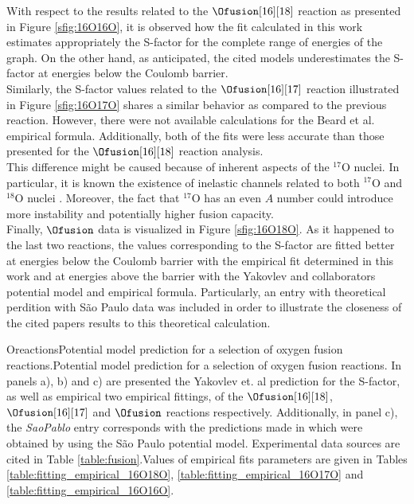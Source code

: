 \documentclass[openany]{book}
\begin{document}
With respect to the results related to the $\Ofusion[16][18]$ reaction as presented in Figure \ref{sfig:16O16O}, it is observed how the fit calculated in this work estimates appropriately the S-factor for the complete range of energies of the graph. On the other hand, as anticipated, the cited models underestimates the S-factor at energies below the Coulomb barrier. \\

Similarly, the S-factor values related to the $\Ofusion[16][17]$ reaction illustrated in Figure  \ref{sfig:16O17O} shares a similar behavior as compared to the previous reaction. However, there were not available calculations for the Beard et al. empirical formula. Additionally, both of the fits were less accurate than those presented for the $\Ofusion[16][18]$  reaction analysis. \\

This difference might be caused because of inherent aspects of the $\mathrm{{}^{17}O}$ nuclei. In particular, it is known the existence of inelastic channels related to both $\mathrm{{}^{17}O}$ and $\mathrm{{}^{18}O}$ nuclei \cite{kovar_geesaman_braid_eisen_henning_ophel_paul_rehm_sanders_sperr_et_1979}. Moreover, the fact that $\mathrm{{}^{17}O}$ has an even $A$ number could introduce more instability and potentially higher fusion capacity. \\

Finally,  $\Ofusion$ data is visualized in Figure \ref{sfig:16O18O}. As it happened to the last two reactions, the values corresponding to the S-factor are fitted better at energies below the Coulomb barrier with the empirical fit determined in this work and at energies above the barrier with the Yakovlev and collaborators potential model and empirical formula. Particularly, an entry with theoretical perdition with São Paulo data was included in order to illustrate the closeness of the cited papers results to this theoretical calculation. 


{Oreactions}{Potential model prediction for a selection of oxygen fusion reactions.}{Potential model prediction for a selection of oxygen fusion reactions. In panels a), b) and c) are presented the  Yakovlev et. al prediction for the S-factor, as well as empirical two empirical fittings,  of the $\Ofusion[16][18]$, $\Ofusion[16][17]$ and $\Ofusion$ reactions respectively. Additionally, in panel c), the \textit{SaoPablo} entry corresponds with the predictions made in \cite{yakovlev_beard_gasques_wiescher_2010} which were obtained by using the São Paulo potential model. Experimental data sources are cited in Table \ref{table:fusion}.Values of empirical fits parameters are given in Tables \ref{table:fitting_empirical_16O18O}, \ref{table:fitting_empirical_16O17O} and \ref{table:fitting_empirical_16O16O}.}
\end{document}
